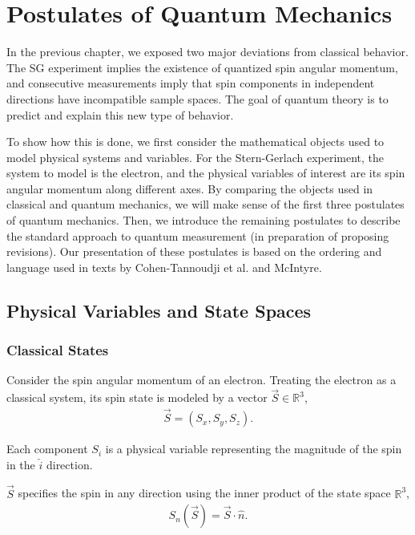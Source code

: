 \chapter{Postulates of Quantum Mechanics} \label{Chapter 3}

In the previous chapter, we exposed two major deviations from classical behavior. The SG experiment implies the existence of quantized spin angular momentum, and consecutive measurements imply that spin components in independent directions have incompatible sample spaces. The goal of quantum theory is to predict and explain this new type of behavior.

To show how this is done, we first consider the mathematical objects used to model physical systems and variables. For the Stern-Gerlach experiment, the system to model is the electron, and the physical variables of interest are its spin angular momentum along different axes. By comparing the objects used in classical and quantum mechanics, we will make sense of the first three postulates of quantum mechanics. Then, we introduce the remaining postulates to describe the standard approach to quantum measurement (in preparation of proposing revisions). Our presentation of these postulates is based on the ordering and language used in texts by Cohen-Tannoudji et al. \cite{cohen} and McIntyre\cite{mcintyre}.

\section{Physical Variables and State Spaces}
\subsection{Classical States} \label{classical states}
Consider the spin angular momentum of an electron. Treating the electron as a classical system, its spin state is modeled by a vector $\vec{S} \in \mathbb{R}^3$,
\begin{align}
\vec{S} = (S_x, S_y, S_z).
\end{align}

Each component $S_i$ is a physical variable representing the magnitude of the spin in the $\hat{i}$ direction.

$\vec{S}$ specifies the spin in any direction using the inner product of the state space $\mathbb{R}^3$,
\begin{align}
S_n(\vec{S}) = \vec{S} \cdot \hat{n}.
\end{align}

